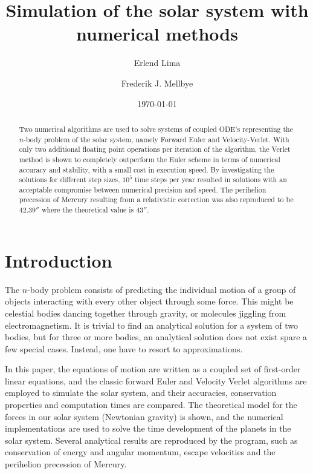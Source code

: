 \documentclass[aps,reprint]{revtex4-1}
\begin{document}
\title{Simulation of the solar system with numerical methods}
\author{Erlend Lima}
\author{Frederik J. Mellbye}
\date{\today}

\begin{abstract}
Two numerical algorithms are used to solve systems of coupled ODE's representing
the\(n\)-body problem of the solar system, namely Forward Euler and Velocity-Verlet. With
only two additional floating point operations per 
iteration of the algorithm, the Verlet method is shown to completely outperform
the Euler scheme in terms of numerical accuracy and stability, 
with a small cost in execution speed. By investigating the solutions for
different step sizes, $10^5$ time steps per year resulted in 
solutions with an acceptable compromise between numerical precision and speed.
The perihelion precession of Mercury resulting from a relativistic correction
was also reproduced to be \(42.39''\) where the theoretical value is \(43''\).
\end{abstract}
\maketitle
\tableofcontents
\makeatletter
\let\toc@pre\relax
\let\toc@post\relax
\makeatother

\newpage

\section{Introduction}
\label{sec:introduction}
The \(n\)-body problem consists of predicting the individual motion of a group of objects
interacting with every other object through some force. This might be celestial
bodies dancing together through gravity, or molecules jiggling from
electromagnetism. It is trivial to find an analytical solution for a system of
two bodies, but for three or more bodies, an analytical solution does not exist
spare a few special cases. Instead, one have to resort to approximations.

In this paper, the equations of motion are written as a coupled set of first-order linear equations, and
the classic forward Euler and Velocity Verlet algorithms are employed to simulate the solar system,
and their accuracies, conservation properties and computation times are compared. The theoretical
model for the forces in our solar system (Newtonian gravity) is shown, and the numerical implementations
are used to solve the time development of the planets in the solar system. Several analytical results
are reproduced by the program, such as conservation of energy and angular momentum, escape velocities
and the perihelion precession of Mercury.
\end{document}
